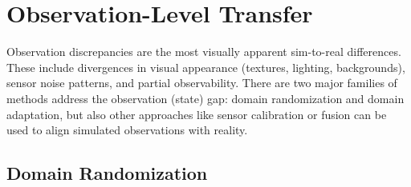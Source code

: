 \section{Observation-Level Transfer}
Observation discrepancies are the most visually apparent sim-to-real differences. These include divergences in visual appearance (textures, lighting, backgrounds), sensor noise patterns, and partial observability. There are two major families of methods address the observation (state) gap: domain randomization and domain adaptation, but also other approaches like sensor calibration or fusion can be used to align simulated observations with reality.

\subsection{Domain Randomization}
